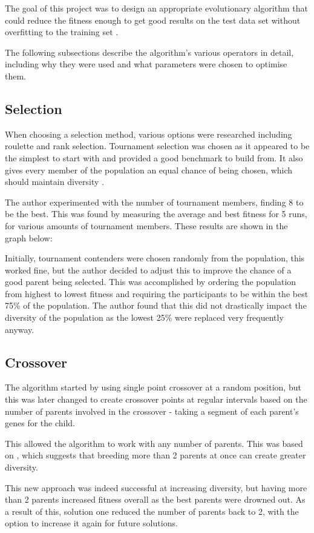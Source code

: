 \documentclass[sigconf]{acmart}
\begin{document}
The goal of this project was to design an appropriate evolutionary algorithm that could reduce the fitness enough to get good results on the test data set without overfitting to the training set \cite{overfitting}.

The following subsections describe the algorithm's various operators in detail, including why they were used and what parameters were chosen to optimise them.

\subsection{Selection}
When choosing a selection method, various options were researched including roulette and rank selection. Tournament selection was chosen as it appeared to be the simplest to start with and provided a good benchmark to build from. It also gives every member of the population an equal chance of being chosen, which should maintain diversity \cite{tournament}.

The author experimented with the number of tournament members, finding 8 to be the best. This was found by measuring the average and best fitness for 5 runs, for various amounts of tournament members. These results are shown in the graph below:

Initially, tournament contenders were chosen randomly from the population, this worked fine, but the author decided to adjust this to improve the chance of a good parent being selected. This was accomplished by ordering the population from highest to lowest fitness and requiring the participants to be within the best 75\% of the population. The author found that this did not drastically impact the diversity of the population as the lowest 25\% were replaced very frequently anyway.

\subsection{Crossover}
The algorithm started by using single point crossover at a random position, but this was later changed to create crossover points at regular intervals based on the number of parents involved in the crossover - taking a segment of each parent's genes for the child. 

This allowed the algorithm to work with any number of parents. This was based on \cite{multipleParents}, which suggests that breeding more than 2 parents at once can create greater diversity.

This new approach was indeed successful at increasing diversity, but having more than 2 parents increased fitness overall as the best parents were drowned out. As a result of this, solution one reduced the number of parents back to 2, with the option to increase it again for future solutions.
\end{document}
